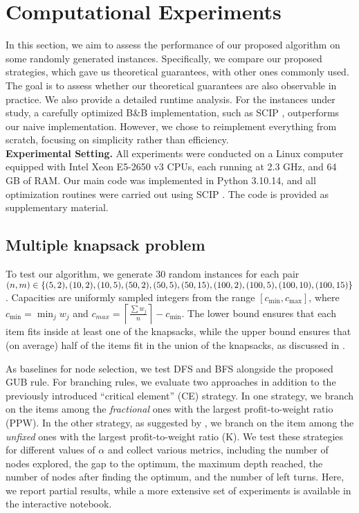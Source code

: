 \documentclass[a4paper,UKenglish,cleveref, autoref, thm-restate, pdfa]{lipics-v2021}
\theoremstyle{plain}
\begin{document}
\section{Computational Experiments}\label{sec:comp_exp}

In this section, we aim to assess the performance of our proposed algorithm on some randomly generated instances. Specifically, we compare our proposed strategies, which gave us theoretical guarantees, with other ones commonly used. The goal is to assess whether our theoretical guarantees are also observable in practice. We also provide a detailed runtime analysis. For the instances under study, a carefully optimized B\&B implementation, such as SCIP \cite{scip}, outperforms our naive implementation. However, we chose to reimplement everything from scratch, focusing on simplicity rather than efficiency. \\

\textbf{Experimental Setting.} All experiments were conducted on a Linux computer equipped with Intel Xeon E5-2650 v3 CPUs, each running at 2.3 GHz, and 64 GB of RAM. Our main code was implemented in Python 3.10.14, and all optimization routines were carried out using SCIP \cite{scip}. The code is provided as supplementary material.

\subsection{Multiple knapsack problem}

To test our algorithm, we generate 30 random instances for each pair $(n, m) \in \{(5, 2), (10, 2), \\(10, 5), (50, 2), (50, 5), (50, 15), (100, 2), (100, 5), (100, 10), (100, 15)\}$. Capacities are uniformly sampled integers from the range $[c_{\min}, c_{\max}]$, where $c_{\min} = \min_{j}{w_j}$ and $c_{max} = \left\lceil \frac{\sum w_j}{n} \right\rceil - c_{\min}$. The lower bound ensures that each item fits inside at least one of the knapsacks, while the upper bound ensures that (on average) half of the items fit in the union of the knapsacks, as discussed in \cite{chvatal}.

As baselines for node selection, we test DFS and BFS alongside the proposed GUB rule. For branching rules, we evaluate two approaches in addition to the previously introduced ``critical element'' (CE) strategy. In one strategy, we branch on the items among the \emph{fractional} ones with the largest profit-to-weight ratio (PPW). In the other strategy, as suggested by \cite{kolesar}, we branch on the item among the \emph{unfixed} ones with the largest profit-to-weight ratio (K).
We test these strategies for different values of $\alpha$ and collect various metrics, including the number of nodes explored, the gap to the optimum, the maximum depth reached, the number of nodes after finding the optimum, and the number of left turns.
Here, we report partial results, while a more extensive set of experiments is available in the interactive notebook. 
\end{document}
